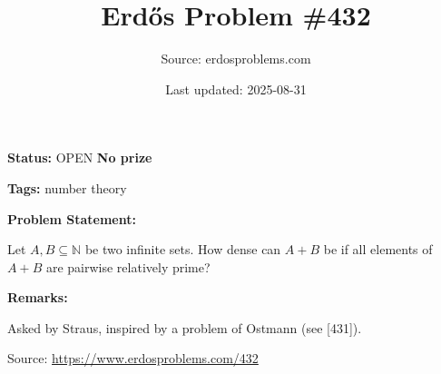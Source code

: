 \documentclass{article}
\title{Erd\H{o}s Problem \#432}
\date{Last updated: 2025-08-31}
\author{Source: erdosproblems.com}
\begin{document}
\maketitle

\noindent\textbf{Status:} OPEN \quad \textbf{No prize}

\noindent\textbf{Tags:} number theory

\medskip
\noindent\textbf{Problem Statement:}

Let $A,B\subseteq \mathbb{N}$ be two infinite sets. How dense can $A+B$ be if all elements of $A+B$ are pairwise relatively prime?

\bigskip
\noindent\textbf{Remarks:}

Asked by Straus, inspired by a problem of Ostmann (see [431]).

\bigskip
\noindent\small{Source: \url{https://www.erdosproblems.com/432}}
\end{document}
